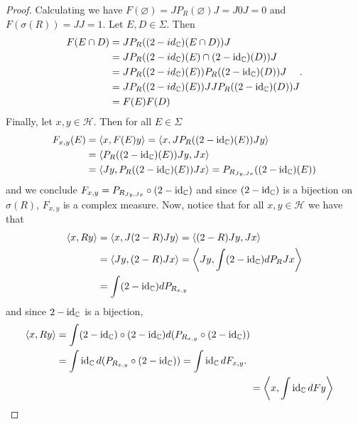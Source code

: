 \begin{proof}
Calculating we have $F(\varnothing)=JP_R(\varnothing)J=J0J=0$ and $F(\sigma(R))=JJ=1$. Let $E,D\in\Sigma$. Then
\begin{align}
\begin{split}
F(E\cap D)&=JP_R((2-id_\mathbb{C})(E\cap D))J \\
&=JP_R((2-id_\mathbb{C})(E)\cap(2-\operatorname{id}_\mathbb{C})(D))J \\
&=JP_R((2-id_\mathbb{C})(E))P_R((2-\operatorname{id}_\mathbb{C})(D))J \\
&=JP_R((2-id_\mathbb{C})(E))JJP_R((2-\operatorname{id}_\mathbb{C})(D))J \\
&=F(E)F(D)
\end{split}.
\end{align}
Finally, let $x,y\in\mathcal{H}$. Then for all $E\in\Sigma$
\begin{align}
\begin{split}
F_{x,y}(E)&=\langle x, F(E) y\rangle = \langle x, JP_R((2-\operatorname{id}_\mathbb{C})(E))Jy\rangle \\
&=\langle P_R((2-\operatorname{id}_\mathbb{C})(E))Jy,Jx\rangle \\
&=\langle Jy,P_R((2-\operatorname{id}_\mathbb{C})(E))Jx\rangle =P_{R_{Jy,Jx}}((2-\operatorname{id}_\mathbb{C})(E))
\end{split}
\end{align}
and we conclude $F_{x,y}=P_{R_{Jy,Jx}}\circ (2-\operatorname{id}_\mathbb{C})$ and since $(2-\operatorname{id}_\mathbb{C})$ is a bijection on $\sigma(R)$, $F_{x,y}$ is a complex measure.
Now, notice that for all $x,y\in\mathcal{H}$ we have that
\begin{align}
\begin{split}
\langle x, Ry \rangle &= \langle x, J(2-R)J y\rangle = \langle (2-R)J y, Jx \rangle \\
&= \langle Jy, (2-R)Jx \rangle = \left\langle Jy, \int (2-\operatorname{id}_\mathbb{C})dP_R Jx\right\rangle \\
&= \int (2-\operatorname{id}_\mathbb{C})dP_{R_{x,y}}
\end{split}
\end{align}
and since $2-\operatorname{id}_\mathbb{C}$ is a bijection,
\begin{align}
\begin{split}
\langle x, Ry\rangle &= \int (2-\operatorname{id}_\mathbb{C})\circ (2-\operatorname{id}_\mathbb{C})d(P_{R_{x,y}}\circ (2-\operatorname{id}_\mathbb{C})) \\
&= \int \operatorname{id}_\mathbb{C} d(P_{R_{x,y}}\circ (2-\operatorname{id}_\mathbb{C})) = \int \operatorname{id}_\mathbb{C} dF_{x,y}.
\end{split} \\
&= \left\langle x, \int \operatorname{id}_\mathbb{C} dF y\right\rangle
\end{align}

\end{proof}
